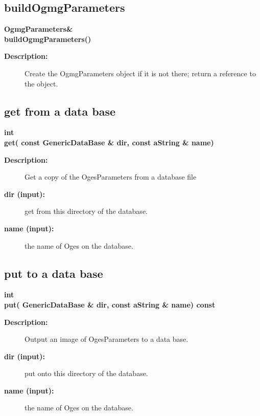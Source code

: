 \subsection{buildOgmgParameters}
 
\begin{flushleft} \textbf{%
OgmgParameters\&  \\ 
\settowidth{\OgesParametersIncludeArgIndent}{buildOgmgParameters(}%
buildOgmgParameters()
}\end{flushleft}
\begin{description}
\item[{\bf Description:}] 
   Create the OgmgParameters object if it is not there; return a reference to the object.
\end{description}
\subsection{get from a data base}
 
\begin{flushleft} \textbf{%
int  \\ 
\settowidth{\OgesParametersIncludeArgIndent}{get(}%
get( const GenericDataBase \& dir, const aString \& name)
}\end{flushleft}
\begin{description}
\item[{\bf Description:}] 
   Get a copy of the OgesParameters from a database file
\item[{\bf dir (input):}]  get from this directory of the database.
\item[{\bf name (input):}]  the name of Oges on the database.
\end{description}
\subsection{put to a data base}
 
\begin{flushleft} \textbf{%
int  \\ 
\settowidth{\OgesParametersIncludeArgIndent}{put(}%
put( GenericDataBase \& dir, const aString \& name) const   
}\end{flushleft}
\begin{description}
\item[{\bf Description:}] 
   Output an image of OgesParameters to a data base. 
\item[{\bf dir (input):}]  put onto this directory of the database.
\item[{\bf name (input):}]  the name of Oges on the database.
\end{description}
